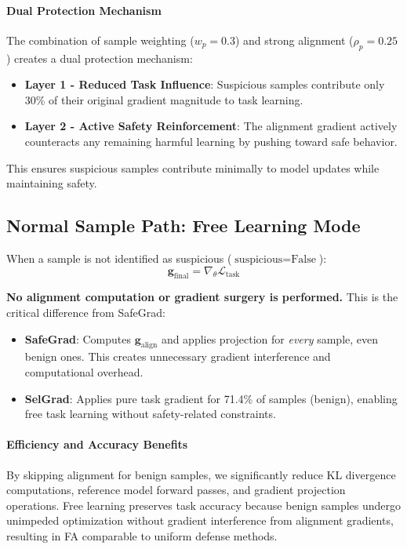 \paragraph{Dual Protection Mechanism}
The combination of sample weighting ($w_p=0.3$) and strong alignment ($\rho_p=0.25$) creates a dual protection mechanism:
\begin{itemize}
    \item \textbf{Layer 1 - Reduced Task Influence}: Suspicious samples contribute only 30\% of their original gradient magnitude to task learning.
    \item \textbf{Layer 2 - Active Safety Reinforcement}: The alignment gradient actively counteracts any remaining harmful learning by pushing toward safe behavior.
\end{itemize}

This ensures suspicious samples contribute minimally to model updates while maintaining safety.

\subsection{Normal Sample Path: Free Learning Mode}
\label{subsec:normal_path}

When a sample is not identified as suspicious ($\text{suspicious} = \text{False}$):
\begin{equation}
\mathbf{g}_{\text{final}} = \nabla_\theta \mathcal{L}_{\text{task}}
\label{eq:free_learning}
\end{equation}

\textbf{No alignment computation or gradient surgery is performed.} This is the critical difference from SafeGrad:

\begin{itemize}
    \item \textbf{SafeGrad}: Computes $\mathbf{g}_{\text{align}}$ and applies projection for \textit{every} sample, even benign ones. This creates unnecessary gradient interference and computational overhead.

    \item \textbf{SelGrad}: Applies pure task gradient for 71.4\% of samples (benign), enabling free task learning without safety-related constraints.
\end{itemize}

\paragraph{Efficiency and Accuracy Benefits}
By skipping alignment for benign samples, we significantly reduce KL divergence computations, reference model forward passes, and gradient projection operations. Free learning preserves task accuracy because benign samples undergo unimpeded optimization without gradient interference from alignment gradients, resulting in FA comparable to uniform defense methods.

